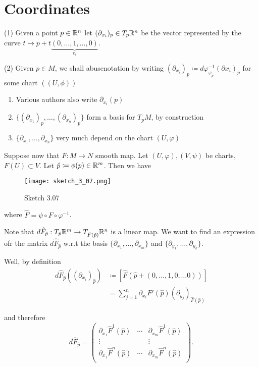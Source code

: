 \section{Coordinates}

\begin{definition*}
    (1) Given a point \(p\in\mathbb{R}^n\) let \((\partial_{x_i})_p\in T_p\mathbb{R}^n\) be the vector represented by 
    the curve \(t\mapsto p+t\underbrace{(0,\dots,1,\dots,0)}_{e_i}\).

    (2) Given \(p\in M\), we shall abusenotation by writing \((\partial_{x_i})_p\coloneqq d\varphi_{\varphi_p}^{-1}(\partial x_i)_p\) for some chart \(((U,\phi))\) 
\end{definition*}

\begin{remark}
    \begin{enumerate}
        \item Various authors also write \(\partial_{x_i}(p)\)
        \item  \(\{(\partial_{x_1})_p,\dots,(\partial_{x_n})_p\}\) form a basis for \(T_pM\), by construction
        \item \(\{\partial_{x_1},\dots,\partial_{x_n}\}\) very much depend on the chart \((U,\varphi)\)
    \end{enumerate}
\end{remark}

Suppose now that \(F:M\to N\) smooth map. Let \((U,\varphi),(V,\psi)\) be charts, \(F(U)\subset V\). Let 
\(\hat{p}\coloneqq \phi(p)\in\mathbb{R}^m\). Then we have 
\begin{figure}[H]
    \centering
    \texttt{[image: sketch\_3\_07.png]}
    \caption{Sketch 3.07}
\end{figure}
where \(\hat{F}=\psi\circ F\circ \varphi^{-1}\).

Note that \(d\hat{F}_{\hat{p}}:T_{\hat{p}}\mathbb{R}^m\to T_{\hat{F}(\hat{p})}\mathbb{R}^n\) is a linear map. We want to find 
an expression ofr the matrix  \(d\hat{F}_{\hat{p}}\) w.r.t the basis \(\{\partial_{x_1},\dots,\partial_{x_m}\}\) and \(\{\partial_{y_1},\dots,\partial_{y_k}\}\).

Well, by definition
\begin{align*}
    d\hat{F}_{\hat{p}}((\partial_{x_i})_{\hat{p}})&\coloneqq [\hat{F}(\hat{p}+(0,\dots,1,0,\dots 0))]\\
    &=\sum_{j=1}^n \partial_{{x_i}} F^j(\hat{p})(\partial_{y_j})_{\hat{F}(\hat{p})}
\end{align*}

and therefore 
\[d\hat{F}_{\hat{p}}=\begin{pmatrix}
    \partial_{x_1} \hat{F}^1(\hat{p}) & \cdots &\partial_{x_m} \hat{F}^1(\hat{p})\\
    \vdots & & \vdots \\
    \partial_{x_1} \hat{F}^n(\hat{p}) & \cdots &\partial_{x_m} \hat{F}^n(\hat{p})\\
\end{pmatrix}.\]


